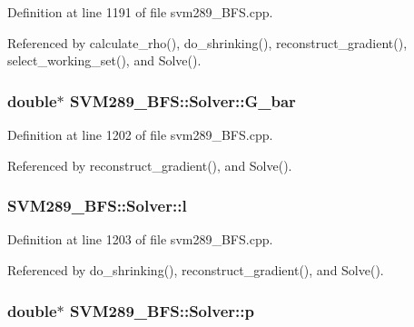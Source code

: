 Definition at line 1191 of file svm289\+\_\+\+B\+F\+S.\+cpp.



Referenced by calculate\+\_\+rho(), do\+\_\+shrinking(), reconstruct\+\_\+gradient(), select\+\_\+working\+\_\+set(), and Solve().

\subsubsection[{\texorpdfstring{G\+\_\+bar}{G_bar}}]{\setlength{\rightskip}{0pt plus 5cm}double$\ast$ S\+V\+M289\+\_\+\+B\+F\+S\+::\+Solver\+::\+G\+\_\+bar\hspace{0.3cm}{\ttfamily [protected]}}\hypertarget{class_s_v_m289___b_f_s_1_1_solver_a81ba66cfcf5abb112056da0e56fce551}{}\label{class_s_v_m289___b_f_s_1_1_solver_a81ba66cfcf5abb112056da0e56fce551}


Definition at line 1202 of file svm289\+\_\+\+B\+F\+S.\+cpp.



Referenced by reconstruct\+\_\+gradient(), and Solve().

\subsubsection[{\texorpdfstring{l}{l}}]{ S\+V\+M289\+\_\+\+B\+F\+S\+::\+Solver\+::l\hspace{0.3cm}{\ttfamily [protected]}}\hypertarget{class_s_v_m289___b_f_s_1_1_solver_af63e60689ab3dd865e76e2c1d35db148}{}\label{class_s_v_m289___b_f_s_1_1_solver_af63e60689ab3dd865e76e2c1d35db148}


Definition at line 1203 of file svm289\+\_\+\+B\+F\+S.\+cpp.



Referenced by do\+\_\+shrinking(), reconstruct\+\_\+gradient(), and Solve().

\subsubsection[{\texorpdfstring{p}{p}}]{\setlength{\rightskip}{0pt plus 5cm}double$\ast$ S\+V\+M289\+\_\+\+B\+F\+S\+::\+Solver\+::p\hspace{0.3cm}{\ttfamily [protected]}}\hypertarget{class_s_v_m289___b_f_s_1_1_solver_a4c3032a9c43561e743ba7a807ab1c1c7}{}\label{class_s_v_m289___b_f_s_1_1_solver_a4c3032a9c43561e743ba7a807ab1c1c7}


